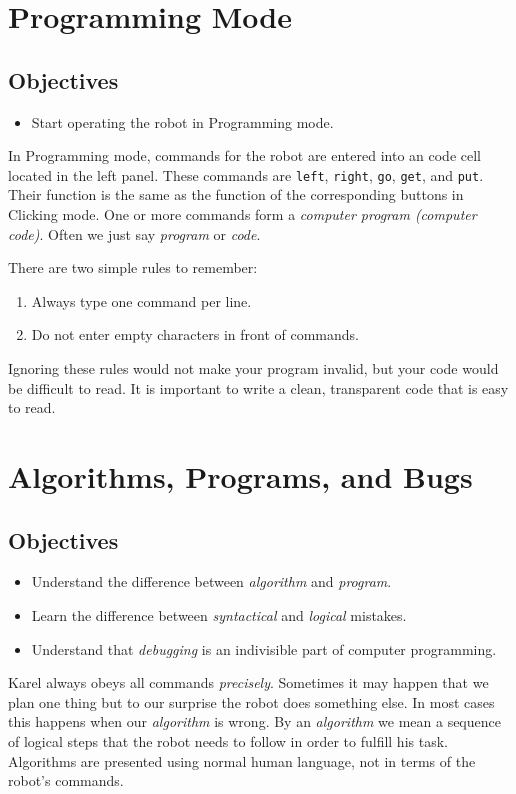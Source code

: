 
\section{Programming Mode} \label{sec:bridge}

\subsection{Objectives} 
 
\begin{itemize}
\item Start operating the robot in Programming mode.
\end{itemize}
In Programming mode, commands for the robot are entered into an code cell located in the left panel.
These commands are {\tt left}, {\tt right}, {\tt go}, {\tt get}, and {\tt put}.
Their function is the same as the function of the corresponding buttons in Clicking mode.
One or more commands form a {\em computer program (computer code)}. Often 
we just say {\em program} or {\em code}.

There are two simple rules to remember:
\begin{enumerate}
\item Always type one command per line.
\item Do not enter empty characters in front of commands. 
\end{enumerate}
Ignoring these rules would not make your program invalid, but your code would be 
difficult to read. It is important to write a clean, transparent code that is easy to read. 


\section{Algorithms, Programs, and Bugs} \label{sec:interm1}

\subsection{Objectives} 
 
\begin{itemize}
\item Understand the difference between {\em algorithm} and {\em program}. 
\item Learn the difference between {\em syntactical} and {\em logical} mistakes.
\item Understand that {\em debugging} is an indivisible part of computer programming.
\end{itemize}
Karel always obeys all commands {\em precisely}. Sometimes it may happen that 
we plan one thing but to our surprise the robot does something else. In most cases this 
happens when our {\em algorithm} is wrong. By an {\em algorithm} we mean a sequence of 
logical steps that the robot needs to follow in order to fulfill his task. Algorithms 
are presented using normal human language, not in terms of the robot's commands. 

